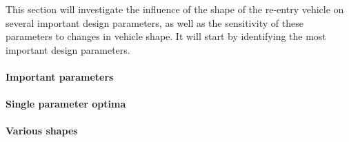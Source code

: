 This section will investigate the influence of the shape of the re-entry vehicle on several important design parameters, as well as the sensitivity of these parameters to changes in vehicle shape. It will start by identifying the most important design parameters. 

\paragraph{Important parameters}


\paragraph{Single parameter optima}


\paragraph{Various shapes}

